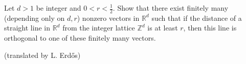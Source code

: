 Let $d>1$ be integer and $0<r<\frac12$. Show that there exist finitely many (depending only on $d,r$) nonzero vectors in $\mathbb{R}^d$ such that if the distance of a straight line in $\mathbb{R}^d$ from the integer lattice $\mathbb{Z}^d$ is at least $r$, then this line is orthogonal to one of these finitely many vectors.

(translated by L. Erdős)